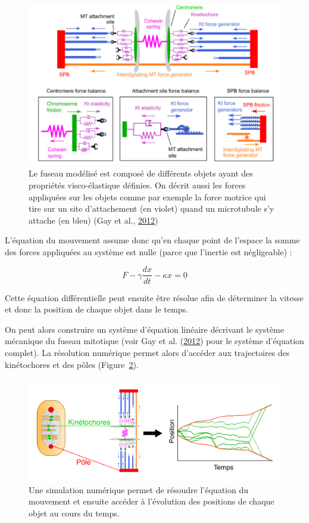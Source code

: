 \documentclass[12pt,a4paper,twoside,openright]{book}
\begin{document}
\begin{figure}[htbp]
\centering
\includegraphics{figures/intro/spindle_model.png}
\caption[Modélisation mécanique du fuseau mitotique]{\label{fig:spindle_model}Le
fuseau modélisé est composé de différents objets ayant des propriétés
visco-élastique définies. On décrit aussi les forces appliquées sur les
objets comme par exemple la force motrice qui tire sur un site
d'attachement (en violet) quand un microtubule s'y attache (en bleu)
(Gay et al., \protect\hyperlink{ref-Gay2012a}{2012})}
\end{figure}

L'équation du mouvement assume donc qu'en chaque point de l'espace la
somme des forces appliquées au système est nulle (parce que l'inertie
est négligeable) :

\[
F - \gamma\frac{dx}{dt} - \kappa x = 0
\]

Cette équation différentielle peut ensuite être résolue afin de
déterminer la vitesse et donc la position de chaque objet dans le temps.

On peut alors construire un système d'équation linéaire décrivant le
système mécanique du fuseau mitotique (voir Gay et al.
(\protect\hyperlink{ref-Gay2012a}{2012}) pour le système d'équation
complet). La résolution numérique permet alors d'accéder aux
trajectoires des kinétochores et des pôles
(Figure~\ref{fig:traj_model}).

\begin{figure}[htbp]
\centering
\includegraphics{figures/intro/traj_model.png}
\caption[Trajectoire des chromosomes \_in silico\_]{\label{fig:traj_model}Une
simulation numérique permet de résoudre l'équation du mouvement et
ensuite accéder à l'évolution des positions de chaque objet au cours du
temps.}
\end{figure}
\end{document}
